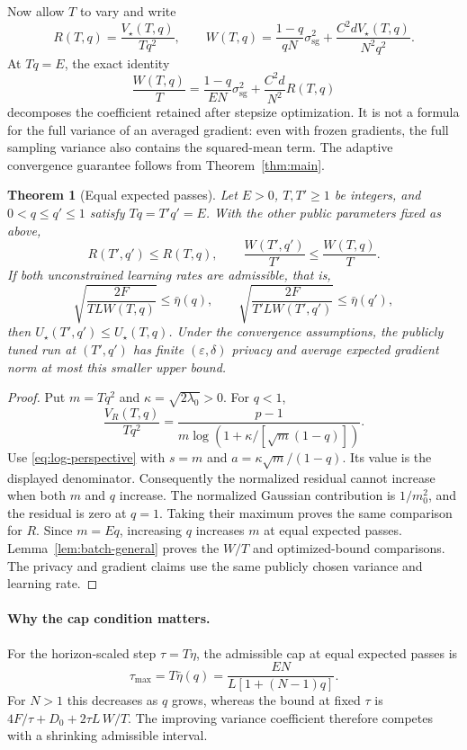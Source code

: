 \documentclass[11pt]{article}
\newtheorem{theorem}{Theorem}[section]
\newcommand{\sg}{\mathrm{sg}}
\begin{document}
Now allow $T$ to vary and write
\[
 R(T,q)=\frac{V_\star(T,q)}{Tq^2},\qquad
 W(T,q)=\frac{1-q}{qN}\sigma_{\sg}^2+
             \frac{C^2dV_\star(T,q)}{N^2q^2}.
\]
At $Tq=E$, the exact identity
\begin{equation}\label{eq:fixed-pass-normalization}
 \frac{W(T,q)}{T}
 =\frac{1-q}{EN}\sigma_{\sg}^2+\frac{C^2d}{N^2}R(T,q)
\end{equation}
decomposes the coefficient retained after stepsize optimization. It is not
a formula for the full variance of an averaged gradient: even with frozen
gradients, the full sampling variance also contains the squared-mean term.
The adaptive convergence guarantee follows from Theorem~\ref{thm:main}.

\begin{theorem}[Equal expected passes]\label{thm:fixed-passes}
Let $E>0$, $T,T'\ge1$ be integers, and $0<q\le q'\le1$ satisfy
$Tq=T'q'=E$. With the other public parameters fixed as above,
\[
 R(T',q')\le R(T,q),\qquad
 \frac{W(T',q')}{T'}\le\frac{W(T,q)}{T}.
\]
If both unconstrained learning rates are admissible, that is,
\[
 \sqrt{\frac{2F}{TLW(T,q)}}\le\bar\eta(q),\qquad
 \sqrt{\frac{2F}{T'LW(T',q')}}\le\bar\eta(q'),
\]
then $U_\star(T',q')\le U_\star(T,q)$. Under the convergence assumptions,
the publicly tuned run at $(T',q')$ has finite $(\varepsilon,\delta)$ privacy
and average expected gradient norm at most this smaller upper bound.
\end{theorem}
\begin{proof}
Put $m=Tq^2$ and $\kappa=\sqrt{2\lambda_0}>0$. For $q<1$,
\[
 \frac{V_R(T,q)}{Tq^2}
 =\frac{p-1}{m\log(1+\kappa/[\sqrt m(1-q)])}.
\]
Use \eqref{eq:log-perspective} with $s=m$ and
$a=\kappa\sqrt m/(1-q)$. Its value is the displayed denominator.
Consequently the normalized residual cannot increase when both $m$ and $q$
increase. The normalized Gaussian contribution is $1/m_0^2$, and the
residual is zero at $q=1$. Taking their maximum proves the same comparison
for $R$. Since $m=Eq$, increasing $q$ increases $m$ at equal expected passes.
Lemma~\ref{lem:batch-general} proves the $W/T$ and optimized-bound comparisons.
The privacy and gradient claims use the same
publicly chosen variance and learning rate.
\end{proof}

\paragraph{Why the cap condition matters.}
For the horizon-scaled step $\tau=T\eta$, the admissible cap at equal expected
passes is
\begin{equation}\label{eq:fixed-pass-cap}
 \tau_{\max}=T\bar\eta(q)
 =\frac{EN}{L[1+(N-1)q]}.
\end{equation}
For $N>1$ this decreases as $q$ grows, whereas the bound at fixed $\tau$ is
$4F/\tau+D_0+2\tau L\,W/T$. The improving variance coefficient therefore
competes with a shrinking admissible interval.
\end{document}
